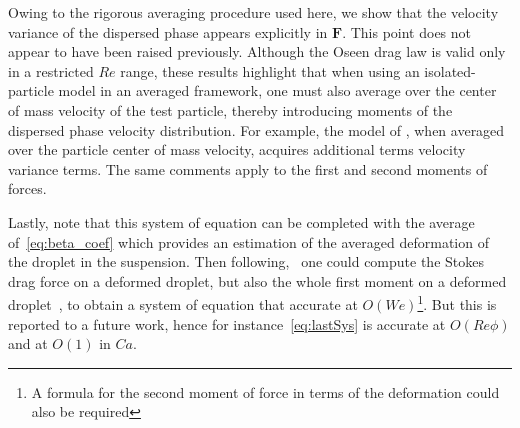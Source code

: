 Owing to the rigorous averaging procedure used here, we show that the velocity variance of the dispersed phase appears explicitly in $\textbf{F}$. 
This point does not appear to have been raised previously. Although the Oseen drag law is valid only in a restricted $Re$ range, these results highlight that when using an isolated-particle model in an averaged framework, one must also average over the center of mass velocity of the test particle, thereby introducing moments of the dispersed phase velocity distribution.
For example, the model of \citet{schiller1933}, when averaged over the particle center of mass velocity, acquires additional terms velocity variance terms. 
The same comments apply to the first and second moments of forces. 


Lastly, note that this system of equation can be completed with the average of~\ref{eq:beta_coef} which provides an estimation of the averaged deformation of the droplet in the suspension. 
Then following,~\citet{taylor1964deformation} one could compute the Stokes drag force on a deformed droplet, but also the whole first moment on a deformed droplet~\citep{schowalter1968rheological}, to obtain a system of equation that accurate at $O(We)$\footnote{A formula for the second moment of force in terms of the deformation could also be required}. 
But this is reported to a future work, hence for instance~\ref{eq:lastSys} is accurate at $O(Re \phi)$ and at $O(1)$ in $Ca$.  



